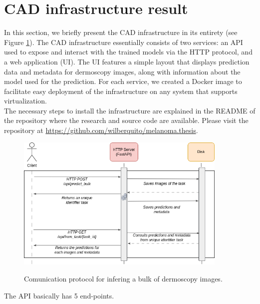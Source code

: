 \section{CAD infrastructure result}

In this section, we briefly present the CAD infrastructure in its entirety (see
Figure \ref{fig:background-task}). The CAD infrastructure essentially consists
of two services: an API used to expose and interact with the trained models via
the HTTP protocol, and a web application (UI). The UI features a simple layout
that displays prediction data and metadata for dermoscopy images, along with
information about the model used for the prediction. For each service, we
created a Docker image to facilitate easy deployment of the infrastructure on
any system that supports virtualization. \\

The necessary steps to install the infrastructure are explained in the README
of the repository where the research and source code are available. Please
visit the repository at
\href{https://github.com/wilberquito/melanoma.thesis}{https://github.com/wilberquito/melanoma.thesis}.


\begin{figure}[H]
  \centering
  \includegraphics[width=0.9\textwidth]{imatges/cad-result/BackgroundTask.drawio.png}
  \caption{Comunication protocol for infering a bulk of dermoscopy images.}
  {\label{fig:background-task}}
\end{figure}

The API basically has 5 end-points.

